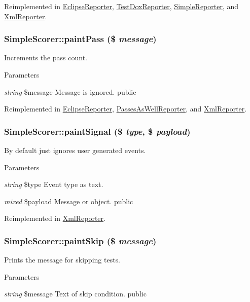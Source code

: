 Reimplemented in \hyperlink{class_eclipse_reporter_a3beefc3a53542af1e4eb1dbca13a69fb}{EclipseReporter}, \hyperlink{class_test_dox_reporter_a1d7d83c7832d12c8626245ec38b80a96}{TestDoxReporter}, \hyperlink{class_simple_reporter_a54672d58e0fad0e0e672159dd4f61124}{SimpleReporter}, and \hyperlink{class_xml_reporter_a9d879c209e50eadfcdbd8e3bfc7ba226}{XmlReporter}.\hypertarget{class_simple_scorer_a02d68e8d94800e50603413d1913c25d0}{
\subsubsection[{paintPass}]{\setlength{\rightskip}{0pt plus 5cm}SimpleScorer::paintPass (\$ {\em message})}}
\label{class_simple_scorer_a02d68e8d94800e50603413d1913c25d0}
Increments the pass count. 
\begin{DoxyParams}{Parameters}
\item[{\em string}]\$message Message is ignored.  public \end{DoxyParams}


Reimplemented in \hyperlink{class_eclipse_reporter_a845512e7138f1f8f1fc4a710d0e4960f}{EclipseReporter}, \hyperlink{class_passes_as_well_reporter_a5dd3369d83cca3dded4900b1cb209f51}{PassesAsWellReporter}, and \hyperlink{class_xml_reporter_a0ca13e019e6eac83f1f5c91cae05f30d}{XmlReporter}.\hypertarget{class_simple_scorer_a968ed699077b65e8a55e2a86fabe5589}{
\subsubsection[{paintSignal}]{\setlength{\rightskip}{0pt plus 5cm}SimpleScorer::paintSignal (\$ {\em type}, \/  \$ {\em payload})}}
\label{class_simple_scorer_a968ed699077b65e8a55e2a86fabe5589}
By default just ignores user generated events. 
\begin{DoxyParams}{Parameters}
\item[{\em string}]\$type Event type as text. \item[{\em mixed}]\$payload Message or object.  public \end{DoxyParams}


Reimplemented in \hyperlink{class_xml_reporter_a813227fd450676eaaf89f3d513580e25}{XmlReporter}.\hypertarget{class_simple_scorer_aa82186cb9bf706d675336aefd6ba355f}{
\subsubsection[{paintSkip}]{\setlength{\rightskip}{0pt plus 5cm}SimpleScorer::paintSkip (\$ {\em message})}}
\label{class_simple_scorer_aa82186cb9bf706d675336aefd6ba355f}
Prints the message for skipping tests. 
\begin{DoxyParams}{Parameters}
\item[{\em string}]\$message Text of skip condition.  public \end{DoxyParams}


